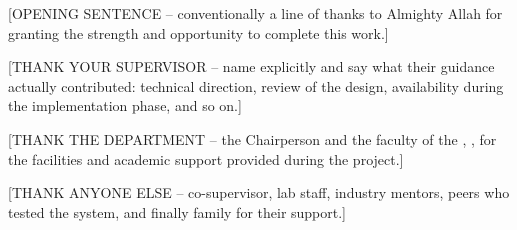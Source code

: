 

[OPENING SENTENCE -- conventionally a line of thanks to Almighty Allah
for granting the strength and opportunity to complete this work.]

[THANK YOUR SUPERVISOR -- name \fypSupervisor{} explicitly and say what
their guidance actually contributed: technical direction, review of the
design, availability during the implementation phase, and so on.]

[THANK THE DEPARTMENT -- the Chairperson and the faculty of the
\fypDepartment, \fypUniversity, for the facilities and academic support
provided during the project.]

[THANK ANYONE ELSE -- co-supervisor, lab staff, industry mentors, peers
who tested the system, and finally family for their support.]

\clearpage

